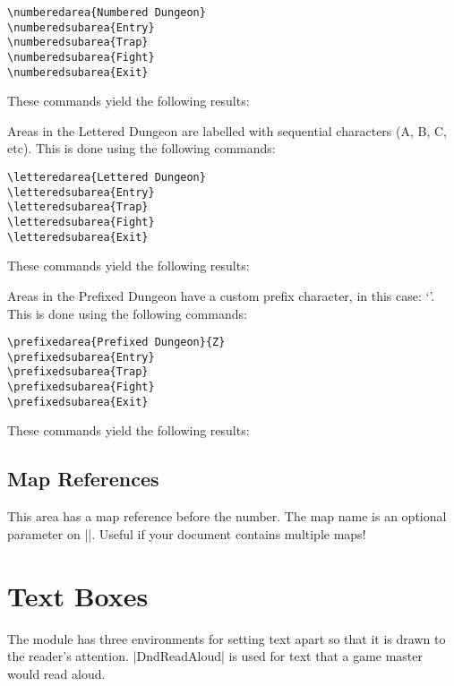 \documentclass[letterpaper,twocolumn,openany,nodeprecatedcode]{dndbook}
\begin{document}
\begin{verbatim}
\numberedarea{Numbered Dungeon}
\numberedsubarea{Entry}
\numberedsubarea{Trap}
\numberedsubarea{Fight}
\numberedsubarea{Exit}
\end{verbatim}

These commands yield the following results:

Areas in the Lettered Dungeon are labelled with sequential characters
(A, B, C, etc). This is done using the following commands:

\begin{verbatim}
\letteredarea{Lettered Dungeon}
\letteredsubarea{Entry}
\letteredsubarea{Trap}
\letteredsubarea{Fight}
\letteredsubarea{Exit}
\end{verbatim}

These commands yield the following results:

Areas in the Prefixed Dungeon have a custom prefix character,
in this case: `\prefixedareaprefix'.
This is done using the following commands:

\begin{verbatim}
\prefixedarea{Prefixed Dungeon}{Z}
\prefixedsubarea{Entry}
\prefixedsubarea{Trap}
\prefixedsubarea{Fight}
\prefixedsubarea{Exit}
\end{verbatim}

These commands yield the following results:

\section{Map References}

This area has a map reference before the number. The map name is an optional parameter on |\DndArea|. Useful if your document contains multiple maps!

\chapter{Text Boxes}

The module has three environments for setting text apart so that it is drawn to the reader's attention. |DndReadAloud| is used for text that a game master would read aloud.
\end{document}

